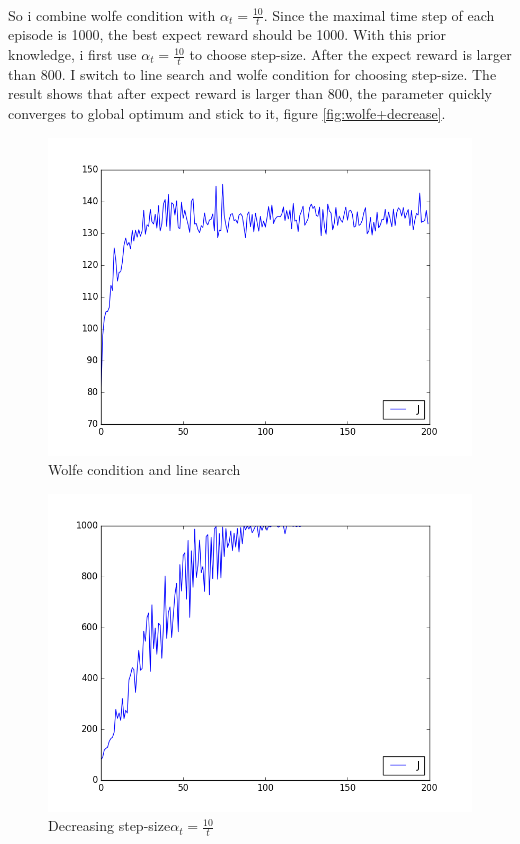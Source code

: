 \documentclass[]{article}
\begin{document}
\paragraph{}So i combine wolfe condition with $\alpha_t=\frac{10}{t}$. Since the maximal time step of each episode is 1000, the best expect reward should be 1000. With this prior knowledge, i first use $\alpha_t=\frac{10}{t}$ to choose step-size. After the expect reward is larger than 800. I switch to line search and wolfe condition for choosing step-size. The result shows that after expect reward is larger than 800, the parameter quickly converges to global optimum and stick to it, figure \ref{fig:wolfe+decrease}. 
\begin{figure}
	\centering
	\includegraphics[width=\linewidth]{wolfe.png}
	\caption{\label{fig:wolfe}Wolfe condition and line search}
\end{figure}
\begin{figure}
	\centering
	\includegraphics[width=\linewidth]{decrease.png}
	\caption{\label{fig:decrease}Decreasing step-size$\alpha_t=\frac{10}{t}$}
\end{figure}
\end{document}
